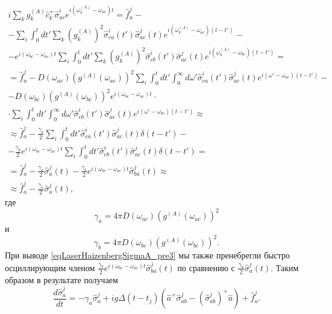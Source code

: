 \begin{eqnarray}
i
\sum_{k}
g_k^{(A)}
\hat{c}_k^{+}\hat{\sigma}^{i}_{ac}  
e^{i\left(\omega_k^{(A)} - \omega_{ac}\right)t} = \hat{f}_{a}^{j} -
\nonumber \\
-
\sum_i
\int_0^t d t'
\sum_k 
\left(g_{k}^{(A)}\right)^2
\hat{\sigma}_{ca}^{i}\left(t'\right)\hat{\sigma}^{j}_{ac}\left(t\right) 
e^{i\left(\omega_{k}^{(A)} - \omega_{ac}\right)\left(t-t'\right)}
-
\nonumber \\
-
e^{i\left(\omega_{bc} - \omega_{ac}\right)t}
\sum_i 
\int_0^t d t'
\sum_k
\left(g_{k}^{(A)}\right)^2
\hat{\sigma}_{cb}^{i}\left(t'\right)\hat{\sigma}^{j}_{ac}\left(t\right) 
e^{i\left(\omega_{k}^{(A)} - \omega_{bc}\right)\left(t-t'\right)}
 = 
\nonumber \\
=
\hat{f}_{a}^{j}
-
D\left(\omega_{ac}\right)
\left(g^{(A)}\left(\omega_{ac}\right)\right)^2
\sum_i
\int_0^t d t'
\int_0^{\infty}d \omega' 
\hat{\sigma}_{ca}^{i}\left(t'\right)\hat{\sigma}^{j}_{ac}\left(t\right) 
e^{i\left(\omega' - \omega_{ac}\right)\left(t-t'\right)}
-
\nonumber \\
-
D\left(\omega_{bc}\right)
\left(g^{(A)}\left(\omega_{bc}\right)\right)^2
e^{i\left(\omega_{bc} - \omega_{ac}\right)t} \cdot
\nonumber \\ 
\cdot
\sum_i 
\int_0^t d t'
\int_0^{\infty}d \omega' 
\hat{\sigma}_{cb}^{i}\left(t'\right)\hat{\sigma}^{j}_{ac}\left(t\right) 
e^{i\left(\omega' - \omega_{bc}\right)\left(t-t'\right)}
\approx
\nonumber \\
\approx
\hat{f}_{a}^{j}
- 
\frac{\gamma_{a}}{2}
\sum_i
\int_0^t d t'
\hat{\sigma}_{ca}^{i}\left(t'\right)\hat{\sigma}^{j}_{ac}\left(t\right) 
\delta\left(t-t'\right)
-
\nonumber \\
-
\frac{\gamma_{b}}{2}
e^{i\left(\omega_{bc} - \omega_{ac}\right)t}
\sum_i 
\int_0^t d t'
\hat{\sigma}_{cb}^{i}\left(t'\right)\hat{\sigma}^{j}_{ac}\left(t\right) 
\delta\left(t-t'\right) =
\nonumber \\
= \hat{f}_{a}^{j}
- 
\frac{\gamma_{a}}{2}
\hat{\sigma}_{a}^{j}\left(t\right) 
-
\frac{\gamma_{b}}{2}
e^{i\left(\omega_{bc} - \omega_{ac}\right)t}
\hat{\sigma}_{ba}^{j}\left(t\right) \approx
\nonumber \\
\approx
\hat{f}_{a}^{j}
- 
\frac{\gamma_{a}}{2}
\hat{\sigma}_{a}^{j}\left(t\right),
\label{eqLaserHaizenbergSigmaA_pre3}
\end{eqnarray}
где 
\[
\gamma_{a} = 4 \pi D\left(\omega_{ac}\right)
\left(g^{(A)}\left(\omega_{ac}\right)\right)^2
\]
и
\[
\gamma_{b} = 4 \pi D\left(\omega_{bc}\right)
\left(g^{(A)}\left(\omega_{bc}\right)\right)^2.
\]
При выводе \eqref{eqLaserHaizenbergSigmaA_pre3} мы также пренебрегли
быстро осциллирующим членом 
$\frac{\gamma_{b}}{2}
e^{i\left(\omega_{bc} - \omega_{ac}\right)t}
\hat{\sigma}_{ba}^{j}\left(t\right)$ 
по сравнению с 
$\frac{\gamma_{a}}{2}
\hat{\sigma}_{a}^{j}\left(t\right)$.
Таким образом в результате получаем
\begin{equation}
\frac{d \hat{\sigma}_a^j}{d t} = 
- \gamma_{a} \hat{\sigma}_{a}^{j} +
i g 
\Delta\left(t - t_j\right) 
 \left(
\hat{a}^{+}\hat{\sigma}^{j}_{ab} -
\left(\hat{\sigma}^{j}_{ab}\right)^{+}\hat{a}
\right) + \hat{f}_{a}^{j}.
\label{eqLaserHaizenbergSigmaAJ}
\end{equation}


